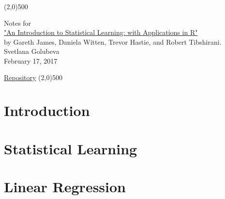 \documentclass[a4paper,12pt,titlepage]{article} %
\begin{document}
\begin{titlepage}

\begin{center}
	\line(2,0){500}
\end{center}

\vspace{60pt}

\begin{center}	
	{\Large{Notes for}}\\
	\vspace{20pt}
	\href{http://www.springer.com/us/book/9781461471370}{\Huge{"An Introduction to Statistical Learning: with Applications in R"}}\\
	\vspace{20pt}
	{\LARGE{by Gareth James, Daniela Witten, Trevor Hastie, and Robert Tibshirani.}}\\
	\vspace{20pt}
	Svetlana Golubeva\\
	\vspace{20pt}
	February 17, 2017
\end{center}

\vspace{\fill}
\begin{center}
	\href{https://github.com/attillax/ISL}{Repository}
	\line(2,0){500}
\end{center}

\end{titlepage}

\tableofcontents
\newpage
\section{Introduction}


\newpage
\section{Statistical Learning}


\newpage
\section{Linear Regression}


\newpage
\end{document}
